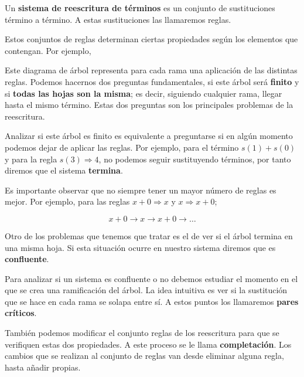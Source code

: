 Un \textbf{sistema de reescritura de términos} es un conjunto de sustituciones
término a término. A estas sustituciones las llamaremos reglas.

Estos conjuntos de reglas determinan ciertas propiedades según los
elementos que contengan. Por ejemplo,

\begin{figure}[h]
  \centering
\end{figure}

Este diagrama de árbol representa para cada rama una aplicación de las
distintas reglas. Podemos hacernos dos preguntas fundamentales, si
este árbol será \textbf{finito} y si \textbf{todas las hojas son la misma}; es decir,
siguiendo cualquier rama, llegar hasta el mismo término. Estas dos
preguntas son los principales problemas de la reescritura.

Analizar si este árbol es finito es equivalente a preguntarse si en
algún momento podemos dejar de aplicar las reglas. Por ejemplo, para
el término $s(1) + s(0)$ y para la regla $s(3) \Rightarrow 4$, no
podemos seguir sustituyendo términos, por tanto diremos que el sistema
\textbf{termina}.

Es importante observar que no siempre tener un mayor número de reglas
es mejor. Por ejemplo, para las reglas $ x + 0 \Rightarrow x$ y
$x \Rightarrow x + 0$;

\[
  x + 0 \longrightarrow x \longrightarrow x+0 \longrightarrow \dots
\]

Otro de los problemas que tenemos que tratar es el de ver si el árbol
termina en una misma hoja. Si esta situación ocurre en nuestro sistema
diremos que es \textbf{confluente}.

Para analizar si un sistema es confluente o no debemos estudiar el
momento en el que se crea una ramificación del árbol. La idea
intuitiva es ver si la sustitución que se hace en cada rama se solapa
entre sí. A estos puntos los llamaremos \textbf{pares críticos}.

También podemos modificar el conjunto reglas de los reescritura para
que se verifiquen estas dos propiedades. A este proceso se le llama
\textbf{completación}. Los cambios que se realizan al conjunto de reglas van
desde eliminar alguna regla, hasta añadir propias.

